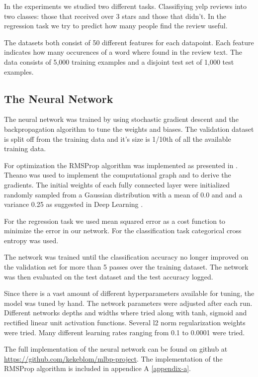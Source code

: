 
In the experiments we studied two different tasks. Classifiying yelp reviews into two classes: those that received over 3 stars and those that didn't. In the regression task we try to predict how many people find the review useful.

The datasets both consist of 50 different features for each datapoint. Each feature indicates how many occurences of a word where found in the review text. The data consists of 5,000 training examples and a disjoint test set of 1,000 test examples.

\subsection{The Neural Network}

The neural network was trained by using stochastic gradient descent and the backpropagation algorithm to tune the weights and biases. The validation dataset is split off from the training data and it's size is 1/10th of all the available training data.

For optimization the RMSProp algorithm was implemented as presented in \cite{deep-learning-book}. Theano \cite{theano} was used to implement the computational graph and to derive the gradients. The initial weights of each fully connected layer were initialized randomly sampled from a Gaussian distribution with a mean of 0.0 and and a variance 0.25 as suggested in Deep Learning \cite{deep-learning-book}.

For the regression task we used mean squared error as a cost function to minimize the error in our network. For the classification task categorical cross entropy was used.

The network was trained until the classification accuracy no longer improved on the validation set for more than 5 passes over the training dataset. The network was then evaluated on the test dataset and the test accuracy logged.

Since there is a vast amount of different hyperparameters available for tuning, the model was tuned by hand. The network parameters were adjusted after each run. Different networks depths and widths where tried along with tanh, sigmoid and rectified linear unit activation functions. Several l2 norm regularization weights were tried. Many different learning rates ranging from 0.1 to 0.0001 were tried.

The full implementation of the neural network can be found on github at \url{https://github.com/kekeblom/mlbp-project}. The implementation of the RMSProp algorithm is included in appendice A \ref{appendix-a}.

